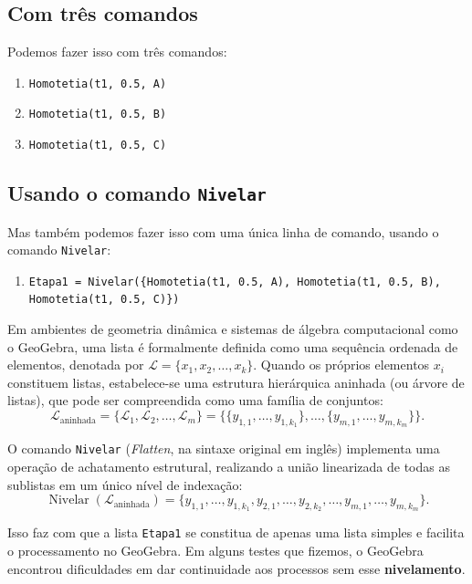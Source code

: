 \documentclass[12pt,a4paper]{report}
\begin{document}
	\subsection{Com três comandos}
	
	Podemos fazer isso com três comandos:
	
	\begin{enumerate}[start=5]
		\item \texttt{Homotetia(t1, 0.5, A)}
		\item \texttt{Homotetia(t1, 0.5, B)}
		\item \texttt{Homotetia(t1, 0.5, C)}
	\end{enumerate}
	
	\subsection{Usando o comando \texttt{Nivelar}}
	
	Mas também podemos fazer isso com uma única linha de comando, usando o comando \texttt{Nivelar}:
	
	\begin{enumerate}[start=5]
		\item \texttt{Etapa1 = Nivelar(\{Homotetia(t1, 0.5, A), Homotetia(t1, 0.5, B), \\Homotetia(t1, 0.5, C)\})}
	\end{enumerate}
	
	\begin{destaque}
		Em ambientes de geometria dinâmica e sistemas de álgebra computacional como o GeoGebra, uma lista é formalmente definida como uma sequência ordenada de elementos, denotada por $\mathcal{L} = \{x_1, x_2, \dots, x_k\}$. Quando os próprios elementos $x_i$ constituem listas, estabelece-se uma estrutura hierárquica aninhada (ou árvore de listas), que pode ser compreendida como uma família de conjuntos:
		\[
		\mathcal{L}_{\text{aninhada}} = \{\mathcal{L}_1, \mathcal{L}_2, \dots, \mathcal{L}_m\} = \big\{\{y_{1,1}, \dots, y_{1,k_1}\}, \dots, \{y_{m,1}, \dots, y_{m,k_m}\}\big\}.
		\]
		
		O comando \texttt{Nivelar} (\textit{Flatten}, na sintaxe original em inglês) implementa uma operação de achatamento estrutural, realizando a união linearizada de todas as sublistas em um único nível de indexação:
		\[
		\operatorname{Nivelar}(\mathcal{L}_{\text{aninhada}}) = \{y_{1,1}, \dots, y_{1,k_1}, y_{2,1}, \dots, y_{2,k_2}, \dots, y_{m,1}, \dots, y_{m,k_m}\}.
		\]
		
		Isso faz com que a lista \texttt{Etapa1} se constitua de apenas uma lista simples e facilita o processamento no GeoGebra. Em alguns testes que fizemos, o GeoGebra encontrou dificuldades em dar continuidade aos processos sem esse \textbf{nivelamento}.
	\end{destaque}
	
\end{document}
